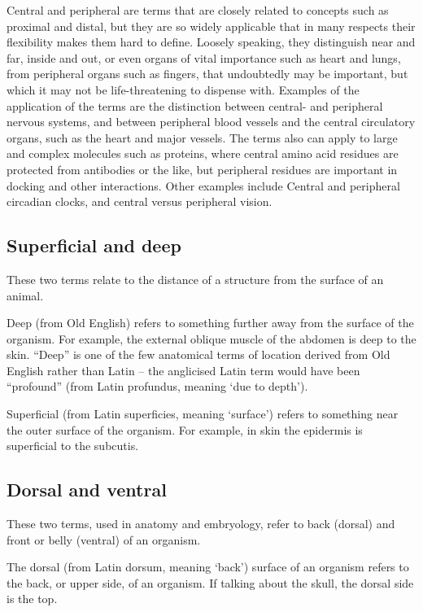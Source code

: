 \documentclass[]{book}
\begin{document}
Central and peripheral are terms that are closely related to concepts such as proximal and distal, but they are so widely applicable that in many respects their flexibility makes them hard to define. Loosely speaking, they distinguish near and far, inside and out, or even organs of vital importance such as heart and lungs, from peripheral organs such as fingers, that undoubtedly may be important, but which it may not be life-threatening to dispense with. Examples of the application of the terms are the distinction between central- and peripheral nervous systems, and between peripheral blood vessels and the central circulatory organs, such as the heart and major vessels. The terms also can apply to large and complex molecules such as proteins, where central amino acid residues are protected from antibodies or the like, but peripheral residues are important in docking and other interactions. Other examples include Central and peripheral circadian clocks, and central versus peripheral vision.

\hypertarget{superficial-and-deep}{%
\subsection{Superficial and deep}\label{superficial-and-deep}}

These two terms relate to the distance of a structure from the surface of an animal.

Deep (from Old English) refers to something further away from the surface of the organism. For example, the external oblique muscle of the abdomen is deep to the skin. ``Deep'' is one of the few anatomical terms of location derived from Old English rather than Latin -- the anglicised Latin term would have been ``profound'' (from Latin profundus, meaning `due to depth').

Superficial (from Latin superficies, meaning `surface') refers to something near the outer surface of the organism. For example, in skin the epidermis is superficial to the subcutis.

\hypertarget{dorsal-and-ventral}{%
\subsection{Dorsal and ventral}\label{dorsal-and-ventral}}

These two terms, used in anatomy and embryology, refer to back (dorsal) and front or belly (ventral) of an organism.

The dorsal (from Latin dorsum, meaning `back') surface of an organism refers to the back, or upper side, of an organism. If talking about the skull, the dorsal side is the top.
\end{document}
